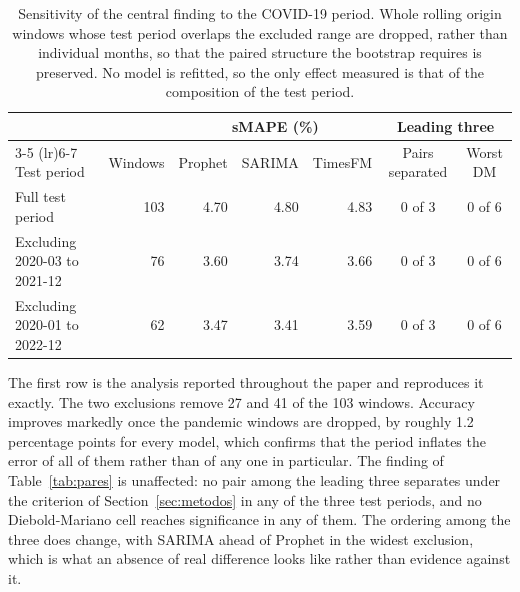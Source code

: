 \begin{table}[htbp]
\centering
\small
\setlength{\tabcolsep}{5pt}
\caption{Sensitivity of the central finding to the COVID-19 period. Whole rolling origin
windows whose test period overlaps the excluded range are dropped, rather than individual
months, so that the paired structure the bootstrap requires is preserved. No model is
refitted, so the only effect measured is that of the composition of the test period.}
\label{tab:covid}
\begin{tabular}{lrrrrcc}
\toprule
& & \multicolumn{3}{c}{sMAPE (\%)} & \multicolumn{2}{c}{Leading three} \\
\cmidrule(lr){3-5} \cmidrule(lr){6-7}
Test period & Windows & Prophet & SARIMA & TimesFM & Pairs separated & Worst DM \\
\midrule
Full test period & 103 & 4.70 & 4.80 & 4.83 & 0 of 3 & 0 of 6 \\
Excluding 2020-03 to 2021-12 & 76 & 3.60 & 3.74 & 3.66 & 0 of 3 & 0 of 6 \\
Excluding 2020-01 to 2022-12 & 62 & 3.47 & 3.41 & 3.59 & 0 of 3 & 0 of 6 \\
\bottomrule
\end{tabular}

\vspace{0.5em}
\begin{minipage}{\textwidth}
\footnotesize
The first row is the analysis reported throughout the paper and reproduces it exactly. The
two exclusions remove 27 and 41 of the 103 windows. Accuracy improves markedly once the
pandemic windows are dropped, by roughly 1.2 percentage points for every model, which
confirms that the period inflates the error of all of them rather than of any one in
particular. The finding of Table~\ref{tab:pares} is unaffected: no pair among the leading
three separates under the criterion of Section~\ref{sec:metodos} in any of the three test
periods, and no Diebold-Mariano cell reaches significance in any of them. The ordering among
the three does change, with SARIMA ahead of Prophet in the widest exclusion, which is what
an absence of real difference looks like rather than evidence against it.
\end{minipage}
\end{table}